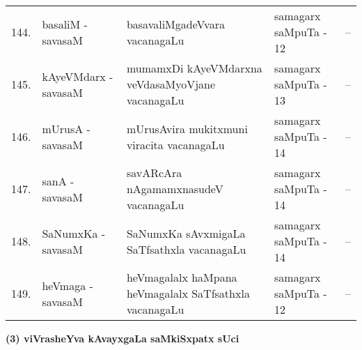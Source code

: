 {\begin{longtable}{rl>{\raggedright}p{5.5cm}lc}
144. & basaliM - savasaM & basavaliMgadeVvara vacanagaLu & samagarx saMpuTa - 12 & --\\
145. & kAyeVMdarx - savasaM & mumamxDi kAyeVMdarxna veVdasaMyoVjane vacanagaLu & samagarx saMpuTa - 13 & --\\
146. & mUrusA - savasaM & mUrusAvira mukitxmuni viracita vacanagaLu & samagarx saMpuTa - 14 & --\\
147. & sanA - savasaM &  savARcAra nAgamamxnasudeV vacanagaLu & samagarx saMpuTa - 14 & --\\
148. & SaNumxKa - savasaM & SaNumxKa sAvxmigaLa SaTfsathxla vacanagaLu & samagarx saMpuTa - 14 & --\\
149. & heVmaga - savasaM & heVmagalalx haMpana heVmagalalx SaTfsathxla vacanagaLu & samagarx saMpuTa - 12 & --\\
\hline
\end{longtable}}

\vskip 1cm

\begin{center}
{\large\bf (3) viVrasheYva kAvayxgaLa saMkiSxpatx sUci}
\end{center}

